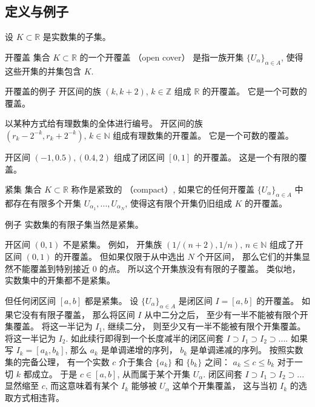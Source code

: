 \subsection{定义与例子}
设 $K\subset\mathbb{R}$ 是实数集的子集。
\begin{definition}{开覆盖}
集合 $K\subset\mathbb{R}$ 的一个开覆盖 （open cover） 是指一族开集 $\{U_{\alpha}\}_{\alpha\in A}$, 使得这些开集的并集包含 $K$.
\end{definition}

\begin{example}{开覆盖的例子}
开区间的族 $(k,k+2),\,k\in\mathbb{Z}$ 组成 $\mathbb{R}$ 的开覆盖。 它是一个可数的覆盖。

以某种方式给有理数集的全体进行编号。 开区间的族 $(r_k-2^{-k},r_k+2^{-k}),\,k\in\mathbb{N}$ 组成有理数集的开覆盖。 它是一个可数的覆盖。

开区间 $(-1,0.5),(0.4,2)$ 组成了闭区间 $[0,1]$ 的开覆盖。 这是一个有限的覆盖。
\end{example}

\begin{definition}{紧集}
集合 $K\subset\mathbb{R}$ 称作是紧致的 （compact）, 如果它的任何开覆盖 $\{U_{\alpha}\}_{\alpha\in A}$ 中都存在有限多个开集 $U_{\alpha_1},...,U_{\alpha_N}$, 使得这有限个开集仍旧组成 $K$ 的开覆盖。 
\end{definition}

\begin{example}{例子}
实数集的有限子集当然是紧集。

开区间 $(0,1)$ 不是紧集。 例如， 开集族 $(1/(n+2),1/n),\,n\in\mathbb{N}$ 组成了开区间 $(0,1)$ 的开覆盖。 但如果仅限于从中选出 $N$ 个开区间， 那么它们的并集显然不能覆盖到特别接近 $0$ 的点。 所以这个开集族没有有限的子覆盖。 类似地， 实数集中的开集都不是紧集。

但任何闭区间 $[a,b]$ 都是紧集。 设 $\{U_\alpha\}_{\alpha\in A}$ 是闭区间 $I=[a,b]$ 的开覆盖。 如果它没有有限子覆盖， 那么将区间 $I$ 从中二分之后， 至少有一半不能被有限个开集覆盖。 将这一半记为 $I_1$, 继续二分， 则至少又有一半不能被有限个开集覆盖。 将这一半记为 $I_2$. 如此续行即得到一个长度减半的闭区间套 $I\supset I_1\supset I_2\supset...$. 如果写 $I_k=[a_k,b_k]$, 那么 $a_k$ 是单调递增的序列， $b_k$ 是单调递减的序列。 按照实数集的完备公理， 有一个实数 $c$ 介于集合 $\{a_k\}$ 和 $\{b_k\}$ 之间： $a_k\leq c\leq b_k$ 对于一切 $k$ 都成立。 于是 $c\in[a,b]$, 从而属于某个开集 $U_\alpha$. 闭区间套 $I\supset I_1\supset I_2\supset...$ 显然缩至 $c$, 而这意味着有某个 $I_k$ 能够被 $U_\alpha$ 这单个开集覆盖， 这与当初 $I_k$ 的选取方式相违背。
\end{example}

